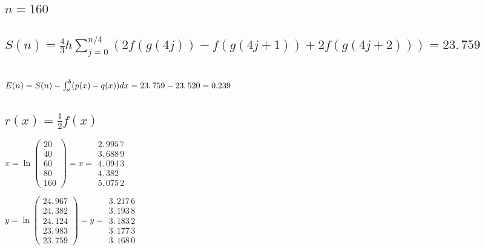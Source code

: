 \documentclass{article}
\begin{document}
\bigskip

\subsection{$n=160$}

\subsection{$S(n)=\frac{4}{3}h\sum%
\limits_{j=0}^{n/4}(2f(g(4j))-f(g(4j+1))+2f(g(4j+2)))=23.\,\allowbreak 759$}

\subsection{$E(n)=S(n)-\protect\int_{a}^{b}(p(x)-q(x))dx\allowbreak
=23.\,\allowbreak 759-23.\,\allowbreak 520=\allowbreak 0.239$}

\subsection{ $r(x)=\frac{1}{2}f(x)$}

\bigskip 

\bigskip $x=\ln (%
\begin{array}{c}
20 \\ 
40 \\ 
60 \\ 
80 \\ 
160%
\end{array}%
)=\allowbreak x=%
\begin{array}{c}
2.\,\allowbreak 995\,7 \\ 
3.\,\allowbreak 688\,9 \\ 
4.\,\allowbreak 094\,3 \\ 
4.\,\allowbreak 382 \\ 
5.\,\allowbreak 075\,2%
\end{array}%
\allowbreak $

$y=\ln (%
\begin{array}{c}
\allowbreak 24.\,\allowbreak 967 \\ 
24.\,\allowbreak 382 \\ 
24.\,\allowbreak 124 \\ 
23.\,\allowbreak 983 \\ 
23.\,\allowbreak 759%
\end{array}%
)=\allowbreak y=%
\begin{array}{c}
3.\,\allowbreak 217\,6 \\ 
3.\,\allowbreak 193\,8 \\ 
3.\,\allowbreak 183\,2 \\ 
3.\,\allowbreak 177\,3 \\ 
3.\,\allowbreak 168\,0%
\end{array}%
\allowbreak $
\end{document}
